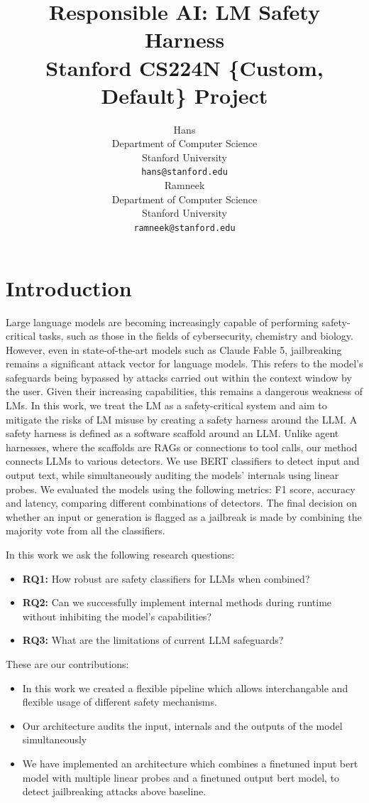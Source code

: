\documentclass{article}
\title{
  Responsible AI: LM Safety Harness \\
  \vspace{1em}
  \small{\normalfont Stanford CS224N \{Custom, Default\} Project}  %
}
\author{
  Hans \\
  Department of Computer Science \\
  Stanford University \\
  \texttt{hans@stanford.edu} \\
  \And
  Ramneek \\
  Department of Computer Science \\
  Stanford University \\
  \texttt{ramneek@stanford.edu} \\
}
\begin{document}
\maketitle

\begin{abstract}
	
\end{abstract}

\section{Introduction}
Large language models are becoming increasingly capable of performing safety-critical tasks, such as those in the fields of cybersecurity, chemistry and biology.
However, even in state-of-the-art models such as Claude Fable 5, jailbreaking remains a significant attack vector for language models. 
This refers to the model's safeguards being bypassed by attacks carried out within the context window by the user. 
Given their increasing capabilities, this remains a dangerous weakness of LMs. 
In this work, we treat the LM as a safety-critical system and aim to mitigate the risks of LM misuse by creating a safety harness around the LLM.
A safety harness is defined as a software scaffold around an LLM. Unlike agent harnesses, where the scaffolds are RAGs or connections to tool calls, our method connects LLMs to various detectors. We use BERT classifiers to detect input and output text, while simultaneously auditing the models' internals using linear probes.
We evaluated the models using the following metrics: F1 score, accuracy and latency, comparing different combinations of detectors. 
The final decision on whether an input or generation is flagged as a jailbreak is made by combining the majority vote from all the classifiers. 
\par 

In this work we ask the following research questions: 
\begin{itemize}
    \item \textbf{RQ1:} How robust are safety classifiers for LLMs when combined? 
    \item \textbf{RQ2:} Can we successfully implement internal methods during runtime without inhibiting the model's capabilities? 
    \item \textbf{RQ3:} What are the limitations of current LLM safeguards?  
\end{itemize}

These are our contributions: 
\begin{itemize}
	\item In this work we created a flexible pipeline which allows interchangable and flexible usage of different safety mechanisms.
    \item Our architecture audits the input, internals and the outputs of the model simultaneously  
	\item  We have implemented an architecture which combines a finetuned input bert model with multiple linear probes and a finetuned output bert model, 
to detect jailbreaking attacks above baseline. 

\end{itemize}
\end{document}
